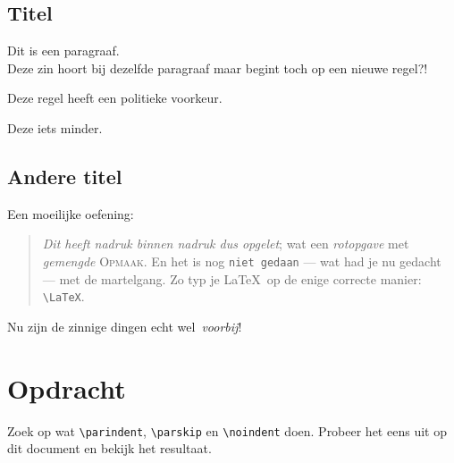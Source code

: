 \documentclass[a4paper]{article}
\begin{document}
\subsection{Titel}
Dit is een paragraaf.\\
Deze zin hoort bij dezelfde paragraaf maar begint toch op een nieuwe regel?!

\begin{flushright}
  Deze regel heeft een politieke voorkeur.
\end{flushright}

\begin{center}
  Deze iets minder.
\end{center}

\subsection{Andere titel}
Een moeilijke oefening:
\begin{quotation}
  \emph{Dit heeft nadruk \emph{binnen nadruk} dus opgelet}; wat een \textsl{rotopgave} met \textit{gemengde} \textsc{Opmaak}. En het is nog \texttt{niet gedaan} --- wat had je nu gedacht --- met de martelgang. Zo typ je \LaTeX\ op de enige correcte manier: \verb|\LaTeX|.
\end{quotation}

Nu zijn de zinnige dingen echt wel~\emph{voorbij}!

\section{Opdracht}
Zoek op wat \verb|\parindent|, \verb|\parskip| en \verb|\noindent| doen. Probeer het eens uit op dit document en bekijk het resultaat.
\end{document}
